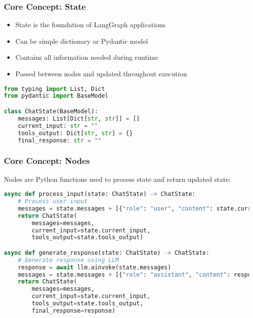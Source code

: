 \begin{frame}[fragile]\frametitle{Core Concept: State}

      \begin{itemize}
        \item State is the foundation of LangGraph applications
        \item Can be simple dictionary or Pydantic model
        \item Contains all information needed during runtime
        \item Passed between nodes and updated throughout execution
      \end{itemize}
	  
      \begin{lstlisting}[language=Python, basicstyle=\small]
from typing import List, Dict
from pydantic import BaseModel

class ChatState(BaseModel):
    messages: List[Dict[str, str]] = []
    current_input: str = ""
    tools_output: Dict[str, str] = {}
    final_response: str = ""
      \end{lstlisting}

\end{frame}

\begin{frame}[fragile]\frametitle{Core Concept: Nodes}
Nodes are Python functions used to process state and return updated state:



      \begin{lstlisting}[language=Python, basicstyle=\small]
async def process_input(state: ChatState) -> ChatState:
    # Process user input
    messages = state.messages + [{"role": "user", "content": state.current_input}]
    return ChatState(
        messages=messages,
        current_input=state.current_input,
        tools_output=state.tools_output)

async def generate_response(state: ChatState) -> ChatState:
    # Generate response using LLM
    response = await llm.ainvoke(state.messages)
    messages = state.messages + [{"role": "assistant", "content": response}]
    return ChatState(
        messages=messages,
        current_input=state.current_input,
        tools_output=state.tools_output,
        final_response=response)
      \end{lstlisting}
\end{frame}

